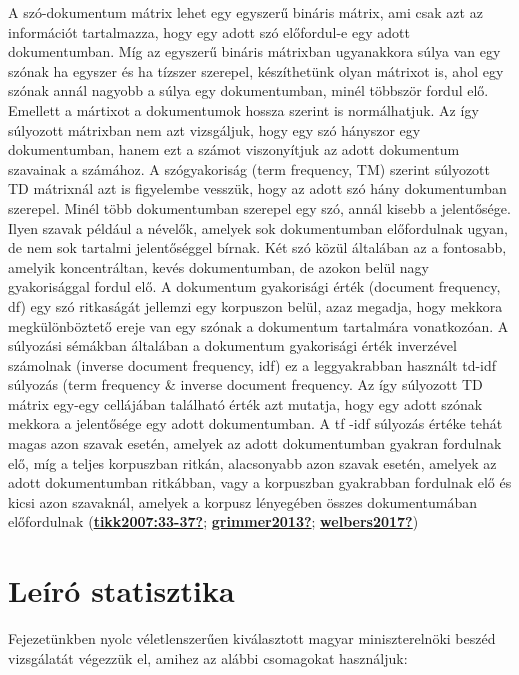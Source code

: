 \documentclass[
]{book}
\begin{document}
A szó-dokumentum mátrix lehet egy egyszerű bináris mátrix, ami csak azt
az információt tartalmazza, hogy egy adott szó előfordul-e egy adott
dokumentumban. Míg az egyszerű bináris mátrixban ugyanakkora súlya van
egy szónak ha egyszer és ha tízszer szerepel, készíthetünk olyan
mátrixot is, ahol egy szónak annál nagyobb a súlya egy dokumentumban,
minél többször fordul elő. Emellett a mártixot a dokumentumok hossza
szerint is normálhatjuk. Az így súlyozott mátrixban nem azt vizsgáljuk,
hogy egy szó hányszor egy dokumentumban, hanem ezt a számot viszonyítjuk
az adott dokumentum szavainak a számához. A szógyakoriság (term
frequency, TM) szerint súlyozott TD mátrixnál azt is figyelembe vesszük,
hogy az adott szó hány dokumentumban szerepel. Minél több dokumentumban
szerepel egy szó, annál kisebb a jelentősége. Ilyen szavak például a
névelők, amelyek sok dokumentumban előfordulnak ugyan, de nem sok
tartalmi jelentőséggel bírnak. Két szó közül általában az a fontosabb,
amelyik koncentráltan, kevés dokumentumban, de azokon belül nagy
gyakorisággal fordul elő. A dokumentum gyakorisági érték (document
frequency, df) egy szó ritkaságát jellemzi egy korpuszon belül, azaz
megadja, hogy mekkora megkülönböztető ereje van egy szónak a dokumentum
tartalmára vonatkozóan. A súlyozási sémákban általában a dokumentum
gyakorisági érték inverzével számolnak (inverse document frequency, idf)
ez a leggyakrabban használt td-idf súlyozás (term frequency \& inverse
document frequency. Az így súlyozott TD mátrix egy-egy cellájában
található érték azt mutatja, hogy egy adott szónak mekkora a jelentősége
egy adott dokumentumban. A tf -idf súlyozás értéke tehát magas azon
szavak esetén, amelyek az adott dokumentumban gyakran fordulnak elő, míg
a teljes korpuszban ritkán, alacsonyabb azon szavak esetén, amelyek az
adott dokumentumban ritkábban, vagy a korpuszban gyakrabban fordulnak
elő és kicsi azon szavaknál, amelyek a korpusz lényegében összes
dokumentumában előfordulnak
(\protect\hyperlink{ref-tikk2007:33-37}{\textbf{tikk2007:33-37?}};
\protect\hyperlink{ref-grimmer2013}{\textbf{grimmer2013?}};
\protect\hyperlink{ref-welbers2017}{\textbf{welbers2017?}})

\hypertarget{leuxedruxf3-statisztika}{%
\section{Leíró statisztika}\label{leuxedruxf3-statisztika}}

Fejezetünkben nyolc véletlenszerűen kiválasztott magyar miniszterelnöki
beszéd vizsgálatát végezzük el, amihez az alábbi csomagokat használjuk:
\end{document}
